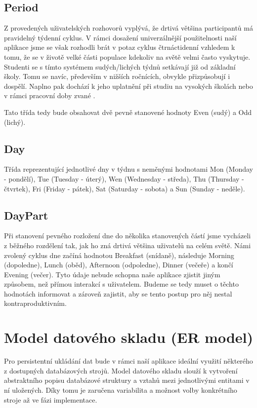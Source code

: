 \documentclass[thesis=M,czech]{FITthesis}[2012/06/26]
\begin{document}
\subsection{Period}
Z provedených uživatelských rozhovorů vyplývá, že drtivá většina participantů má pravidelný týdenní cyklus. V rámci dosažení univerzálnější použitelnosti naší aplikace jsme se však rozhodli brát v potaz cyklus čtrnáctidenní vzhledem k tomu, že se v životě velké části populace kdekoliv na světě velmi často vyskytuje. Studenti se s tímto systémem sudých/lichých týdnů setkávají již od základní školy. Tomu se navíc, především v nižších ročnících, obvykle přizpůsobují i dospělí. Naplno pak dochází k jeho uplatnění při studiu na vysokých školách nebo v rámci pracovní doby zvané .

Tato třída tedy bude obsahovat dvě pevně stanovené hodnoty Even (sudý) a Odd (lichý).

\subsection{Day}
Třída reprezentující jednotlivé dny v týdnu s neměnými hodnotami Mon (Monday - pondělí), Tue (Tuesday - úterý), Wen (Wednesday - středa), Thu (Thursday - čtvrtek), Fri (Friday - pátek), Sat (Saturday - sobota) a Sun (Sunday - neděle).

\subsection{DayPart}
Při stanovení pevného rozložení dne do několika stanovených částí jsme vycházeli z běžného rozdělení tak, jak ho zná drtivá většina uživatelů na celém světě. Námi zvolený cyklus dne začíná hodnotou Breakfast (snídaně), následuje Morning (dopoledne), Lunch (oběd), Afternoon (odpoledne), Dinner (večeře) a končí Evening (večer). Tyto údaje nebude schopna naše aplikace zjistit jiným způsobem, než přímou interakcí s uživatelem. Budeme se tedy muset o těchto hodnotách informovat a zároveň zajistit, aby se tento postup pro něj nestal kontraproduktivním.

\section{Model datového skladu (ER model)}\label{sec:er_model}
Pro persistentní ukládání dat bude v rámci naší aplikace ideální využití některého z dostupných databázových strojů. Model datového skladu slouží k vytvoření abstraktního popisu databázové struktury a vztahů mezi jednotlivými entitami v ní uložených. Díky tomu je zaručena variabilita a možnost volby konkrétního stroje až ve fázi implementace.
\end{document}
